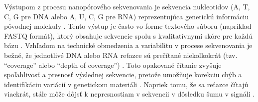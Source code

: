 Výstupom z procesu nanopórového sekvenovania je sekvencia nukleotidov (A, T, C, G pre DNA alebo A, U, C, G pre RNA) reprezentujúca genetickú informáciu pôvodnej molekuly \cite{Zheng2023Nanopore}.
Tento výstup je často vo forme textového súboru (napríklad FASTQ formát), ktorý obsahuje sekvencie spolu s kvalitatívnymi skóre pre každú bázu \cite{Zheng2023Nanopore}.
Vzhľadom na technické obmedzenia a variabilitu v procese sekvenovania je bežné, že jednotlivé DNA alebo RNA reťazce sú prečítané niekoľkokrát (tzv. \enquote{coverage} alebo \enquote{depth of coverage}) \cite{Zheng2023Nanopore}.
Toto opakované čítanie zvyšuje spoľahlivosť a presnosť výslednej sekvencie, pretože umožňuje korekciu chýb a identifikáciu variácií v genetickom materiáli \cite{Zheng2023Nanopore,Lopez2019DNA}.
Napriek tomu, že sa reťazce čítajú viackrát, stále môže dôjsť k nepresnostiam v sekvencii v dôsledku šumu v signáli \cite{Zheng2023Nanopore}.
